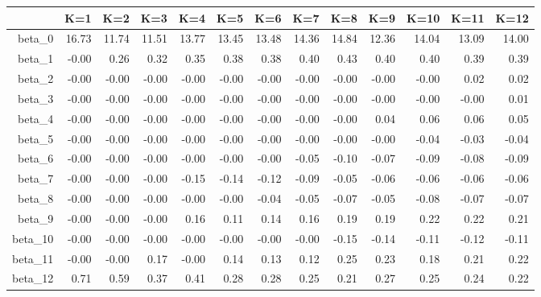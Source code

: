 \begin{table}[ht]
\centering
\begin{tabular}{rrrrrrrrrrrrr}
  \hline
 & K=1 & K=2 & K=3 & K=4 & K=5 & K=6 & K=7 & K=8 & K=9 & K=10 & K=11 & K=12 \\ 
  \hline
beta\_0 & 16.73 & 11.74 & 11.51 & 13.77 & 13.45 & 13.48 & 14.36 & 14.84 & 12.36 & 14.04 & 13.09 & 14.00 \\ 
  beta\_1 & -0.00 & 0.26 & 0.32 & 0.35 & 0.38 & 0.38 & 0.40 & 0.43 & 0.40 & 0.40 & 0.39 & 0.39 \\ 
  beta\_2 & -0.00 & -0.00 & -0.00 & -0.00 & -0.00 & -0.00 & -0.00 & -0.00 & -0.00 & -0.00 & 0.02 & 0.02 \\ 
  beta\_3 & -0.00 & -0.00 & -0.00 & -0.00 & -0.00 & -0.00 & -0.00 & -0.00 & -0.00 & -0.00 & -0.00 & 0.01 \\ 
  beta\_4 & -0.00 & -0.00 & -0.00 & -0.00 & -0.00 & -0.00 & -0.00 & -0.00 & 0.04 & 0.06 & 0.06 & 0.05 \\ 
  beta\_5 & -0.00 & -0.00 & -0.00 & -0.00 & -0.00 & -0.00 & -0.00 & -0.00 & -0.00 & -0.04 & -0.03 & -0.04 \\ 
  beta\_6 & -0.00 & -0.00 & -0.00 & -0.00 & -0.00 & -0.00 & -0.05 & -0.10 & -0.07 & -0.09 & -0.08 & -0.09 \\ 
  beta\_7 & -0.00 & -0.00 & -0.00 & -0.15 & -0.14 & -0.12 & -0.09 & -0.05 & -0.06 & -0.06 & -0.06 & -0.06 \\ 
  beta\_8 & -0.00 & -0.00 & -0.00 & -0.00 & -0.00 & -0.04 & -0.05 & -0.07 & -0.05 & -0.08 & -0.07 & -0.07 \\ 
  beta\_9 & -0.00 & -0.00 & -0.00 & 0.16 & 0.11 & 0.14 & 0.16 & 0.19 & 0.19 & 0.22 & 0.22 & 0.21 \\ 
  beta\_10 & -0.00 & -0.00 & -0.00 & -0.00 & -0.00 & -0.00 & -0.00 & -0.15 & -0.14 & -0.11 & -0.12 & -0.11 \\ 
  beta\_11 & -0.00 & -0.00 & 0.17 & -0.00 & 0.14 & 0.13 & 0.12 & 0.25 & 0.23 & 0.18 & 0.21 & 0.22 \\ 
  beta\_12 & 0.71 & 0.59 & 0.37 & 0.41 & 0.28 & 0.28 & 0.25 & 0.21 & 0.27 & 0.25 & 0.24 & 0.22 \\ 
   \hline
\end{tabular}
\end{table}
